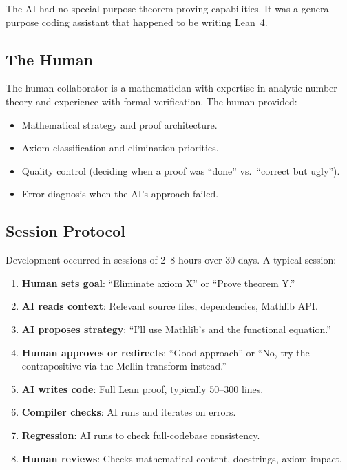 \documentclass[11pt,a4paper]{article}
\begin{document}
The AI had no special-purpose theorem-proving capabilities. It was
a general-purpose coding assistant that happened to be writing Lean~4.

\subsection{The Human}

The human collaborator is a mathematician with expertise in analytic
number theory and experience with formal verification. The human
provided:

\begin{itemize}
  \item Mathematical strategy and proof architecture.
  \item Axiom classification and elimination priorities.
  \item Quality control (deciding when a proof was ``done'' vs.\
    ``correct but ugly'').
  \item Error diagnosis when the AI's approach failed.
\end{itemize}

\subsection{Session Protocol}

Development occurred in sessions of 2--8 hours over 30 days. A
typical session:

\begin{enumerate}
  \item \textbf{Human sets goal}: ``Eliminate axiom X'' or ``Prove
    theorem Y.''
  \item \textbf{AI reads context}: Relevant source files, dependencies,
    Mathlib API.
  \item \textbf{AI proposes strategy}: ``I'll use Mathlib's
     and the functional
    equation.''
  \item \textbf{Human approves or redirects}: ``Good approach'' or
    ``No, try the contrapositive via the Mellin transform instead.''
  \item \textbf{AI writes code}: Full Lean proof, typically 50--300
    lines.
  \item \textbf{Compiler checks}: AI runs  and
    iterates on errors.
  \item \textbf{Regression}: AI runs  to check
    full-codebase consistency.
  \item \textbf{Human reviews}: Checks mathematical content,
    docstrings, axiom impact.
\end{enumerate}
\end{document}
